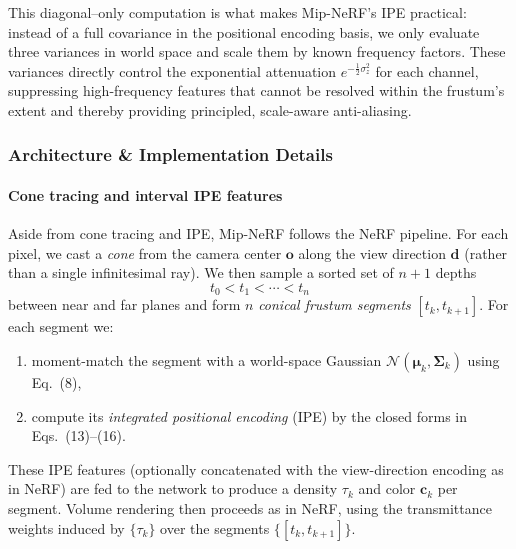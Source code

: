 \begin{enrichment}
\begin{enrichment}
    \medskip
    \noindent
    This diagonal–only computation is what makes Mip-NeRF’s IPE practical: instead of a full covariance in the positional encoding basis, we only evaluate three variances in world space and scale them by known frequency factors. These variances directly control the exponential attenuation $e^{-\frac{1}{2} \sigma_z^2}$ for each channel, suppressing high-frequency features that cannot be resolved within the frustum’s extent and thereby providing principled, scale-aware anti-aliasing.
            
    \subsubsection{Architecture \& Implementation Details}
    \label{subsubsec:chapter23_mipnerf_architecture}
    
    \paragraph{Cone tracing and interval IPE features}
    Aside from cone tracing and IPE, Mip-NeRF follows the NeRF pipeline. For each pixel, we cast a \emph{cone} from the camera center $\mathbf{o}$ along the view direction $\mathbf{d}$ (rather than a single infinitesimal ray). We then sample a sorted set of $n{+}1$ depths
    \[
    t_0 < t_1 < \cdots < t_n
    \]
    between near and far planes and form $n$ \emph{conical frustum segments} $[t_k, t_{k+1}]$. For each segment we:
    \begin{enumerate}
        \item moment-match the segment with a world-space Gaussian $\mathcal{N}(\boldsymbol{\mu}_k, \boldsymbol{\Sigma}_k)$ using Eq.~(8),
        \item compute its \emph{integrated positional encoding} (IPE) by the closed forms in Eqs.~(13)–(16).
    \end{enumerate}
    These IPE features (optionally concatenated with the view-direction encoding as in NeRF) are fed to the network to produce a density $\tau_k$ and color $\mathbf{c}_k$ per segment. Volume rendering then proceeds as in NeRF, using the transmittance weights induced by $\{\tau_k\}$ over the segments $\{[t_k, t_{k+1}]\}$.
    

\end{enrichment}
\end{enrichment}

